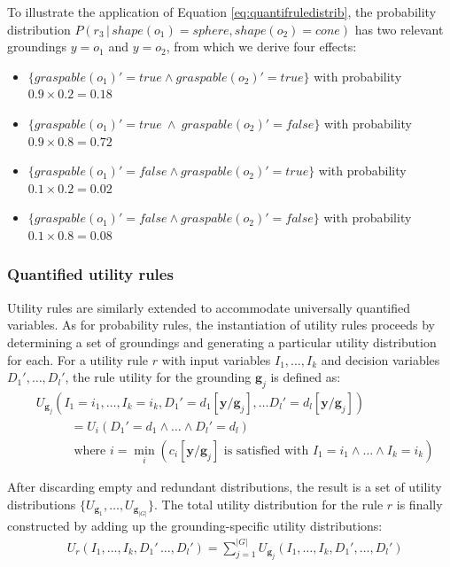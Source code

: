 To illustrate the application of Equation \eqref{eq:quantifruledistrib}, the probability distribution $P(r_3 \, | \, \mathit{shape}(o_1)\!=\!\mathit{sphere}, \mathit{shape}(o_2)\!=\!\mathit{cone})$ has two relevant groundings $y\!=\!o_1$ and $y\!=\!o_2$, from which we derive four effects:
\begin{itemize}
\item $\{\mathit{graspable}(o_1)'\!=\!true \land \mathit{graspable}(o_2)'\!=\!true \} $ with probability $0.9\times0.2\!=\!0.18$
\item $\{\mathit{graspable}(o_1)'\!=\!true \ \land \  \mathit{graspable}(o_2)'\!=\!false\}$ with probability $0.9\times0.8\!=\!0.72$ 
\item $\{ \mathit{graspable}(o_1)'\!=\!false \land \mathit{graspable}(o_2)'\!=\!true \}$ with probability $0.1\times0.2\!=\!0.02$
\item $\{\mathit{graspable}(o_1)'\!=\!false \land \mathit{graspable}(o_2)'\!=\!false\}$ with probability $0.1\times0.8\!=\!0.08$
\end{itemize}


\subsubsection*{Quantified utility rules}

Utility rules are similarly extended to accommodate universally quantified variables. As for probability rules, the instantiation of utility rules proceeds by determining a set of groundings and generating a particular utility distribution for each. 
For a utility rule $r$ with input variables $I_1, \dots, I_k$ and decision variables $D_1', \dots, D_l'$, the rule utility for the grounding $\mathbf{g}_j$ is defined as:
 \begin{align}
& U_{\mathbf{g}_j}(I_1\!=\!i_1, \dots, I_k\!=\!i_k, D_1'\!=\!d_1[\mathbf{y} / \mathbf{g}_j], \dots D_l'\!=\!d_l[\mathbf{y} / \mathbf{g}_j] ) \label{eq:quantifuruledistrib} \\ 
& \; \; \; \; \; \; \; \;   \; \; = U_i(D_1'\!=\!d_1 \land \dots \land D_l'\!=\!d_l) \nonumber \\
& \; \; \; \; \; \; \; \;   \; \; \;\text{where } i = \min_i (c_i[\mathbf{y} / \mathbf{g}_j]\text{ is satisfied with } I_1\!=\!i_1 \land \dots \land I_k\!=\!i_k) \nonumber
\end{align}

After discarding empty and redundant distributions, the result is a set of utility distributions $ \{ U_{\mathbf{g}_1}, \dots, U_{\mathbf{g}_{|G|}} \}$. The total utility distribution for the rule $r$ is finally constructed by adding up the grounding-specific utility distributions:   
\begin{align}
& U_{r}(I_1, \dots, I_k, D_1'\, \dots, D_l') = \sum_{j=1}^{|G|} U_{\mathbf{g}_j}(I_1, \dots, I_k, D_1', \dots, D_l') \label{eq:quantifuruledistrib2}
\end{align}


